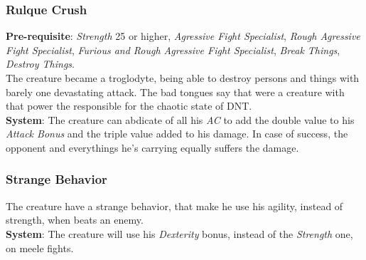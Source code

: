 \documentclass[ letterpaper,12pt]{article}
\begin{document}
\subsubsection{Rulque Crush}
{\bf Pre-requisite}: {\it Strength} 25 or higher, {\it Agressive Fight Specialist}, {\it Rough Agressive Fight Specialist}, {\it Furious and Rough Agressive Fight Specialist}, {\it Break Things}, {\it Destroy Things}.\\
The creature became a troglodyte, being able to destroy persons and things with barely one devastating attack. The bad tongues say that were a creature with that power the responsible for the chaotic state of DNT.\\
{\bf System}: The creature can abdicate of all his {\it AC} to add the double value to his {\it Attack Bonus} and the triple value added to his damage. In case of success, the opponent and everythings he's carrying equally suffers the damage.

\subsubsection{Strange Behavior}
The creature have a strange behavior, that make he use his agility, instead of strength, when beats an enemy.\\
{\bf System}: The creature will use his {\it Dexterity} bonus, instead of the {\it Strength} one, on meele fights.\\
\end{document}
